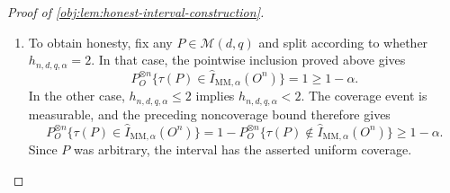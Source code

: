 \documentclass[11pt]{article}
\begin{document}
\begin{proof}[Proof of \cref{obj:lem:honest-interval-construction}]
\begin{enumerate}
Define the noncoverage and squared-error tail events by
\[
\mathcal B_P=\{o\in O^n:\tau(P)\notin[L(o),U(o)]\},
\qquad
\mathcal T_P=\{o\in O^n:h_{n,d,q,\alpha}^2\le\mathcal E_P(o)\}.
\]
We claim that
\[
\mathcal B_P\subseteq\mathcal T_P.
\]
Indeed, noncoverage gives either \(\tau(P)<L(o)\) or \(U(o)<\tau(P)\). In the first case, if
\(-1\le\widehat\tau_{\mathrm{MM}}(o)-h_{n,d,q,\alpha}\), then
\[
L(o)=\widehat\tau_{\mathrm{MM}}(o)-h_{n,d,q,\alpha},
\qquad
h_{n,d,q,\alpha}
<\widehat\tau_{\mathrm{MM}}(o)-\tau(P).
\]
Otherwise \(L(o)=-1\), contradicting \(\tau(P)\ge-1\). In the second case, if
\(\widehat\tau_{\mathrm{MM}}(o)+h_{n,d,q,\alpha}\le1\), then
\[
U(o)=\widehat\tau_{\mathrm{MM}}(o)+h_{n,d,q,\alpha},
\qquad
h_{n,d,q,\alpha}
<\tau(P)-\widehat\tau_{\mathrm{MM}}(o).
\]
Otherwise \(U(o)=1\), contradicting \(\tau(P)\le1\). Squaring the positive inequalities in the two possible cases gives
\[
h_{n,d,q,\alpha}^2
\le\bigl(\widehat\tau_{\mathrm{MM}}(o)-\tau(P)\bigr)^2,
\]
as claimed.

The sample space is finite, so the squared-error function is integrable. Its nonnegativity and Markov's inequality give
\[
h_{n,d,q,\alpha}^2\,\mu_{\mathrm{obs}}(\mathcal T_P)
\le
\int\mathcal E_P(o)\,d\mu_{\mathrm{obs}}(o).
\]
Applying the assumed uniform risk certificate to this iid sample law, and using event inclusion, yields
\[
h_{n,d,q,\alpha}^2\,\mu_{\mathrm{obs}}(\mathcal B_P)
\le
h_{n,d,q,\alpha}^2\,\mu_{\mathrm{obs}}(\mathcal T_P)
\le
\int\mathcal E_P(o)\,d\mu_{\mathrm{obs}}(o)
\le
C_Ur_{n,d,q}
=\alpha h_{n,d,q,\alpha}^2.
\]
Dividing by the strictly positive squared radius proves
\[
P_O^{\otimes n}\{\tau(P)\notin\widehat I_{\mathrm{MM},\alpha}(O^n)\}
\le\alpha.
\]

\item To obtain honesty, fix any \(P\in\mathcal M(d,q)\) and split according to whether \(h_{n,d,q,\alpha}=2\). In that case, the pointwise inclusion proved above gives
\[
P_O^{\otimes n}\{\tau(P)\in\widehat I_{\mathrm{MM},\alpha}(O^n)\}
=1\ge1-\alpha.
\]
In the other case, \(h_{n,d,q,\alpha}\le2\) implies \(h_{n,d,q,\alpha}<2\). The coverage event is measurable, and the preceding noncoverage bound therefore gives
\[
P_O^{\otimes n}\{\tau(P)\in\widehat I_{\mathrm{MM},\alpha}(O^n)\}
=
1-P_O^{\otimes n}\{\tau(P)\notin\widehat I_{\mathrm{MM},\alpha}(O^n)\}
\ge1-\alpha.
\]
Since \(P\) was arbitrary, the interval has the asserted uniform coverage.


\end{enumerate}
\end{proof}
\end{document}
